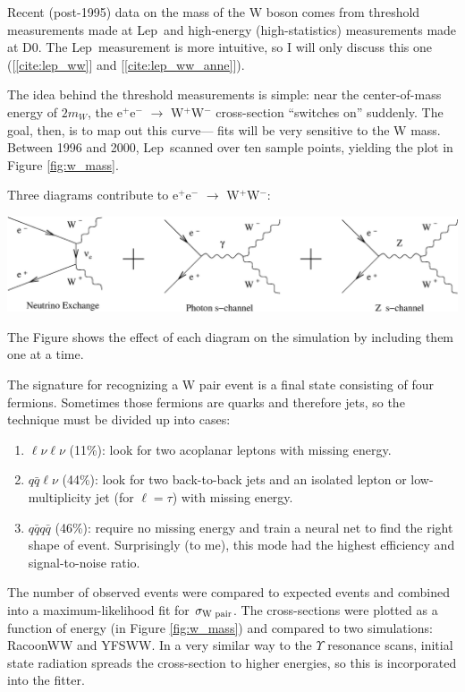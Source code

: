\documentclass[12pt]{article}
\def\lep{{\sc Lep}}
\def\dzero{{\sc D0}}
\begin{document}
Recent (post-1995) data on the mass of the W boson comes from
threshold measurements made at \lep\ and high-energy (high-statistics)
measurements made at \dzero. The \lep\ measurement is more intuitive, so
I will only discuss this one ([\ref{cite:lep_ww}] and
[\ref{cite:lep_ww_anne}]).

The idea behind the threshold measurements is simple: near the
center-of-mass energy of $2m_W$, the e$^+$e$^-$ $\to$ W$^+$W$^-$
cross-section ``switches on'' suddenly. The goal, then, is to map out
this curve--- fits will be very sensitive to the W mass. Between 1996
and 2000, \lep{}anned over ten sample points, yielding the plot in
Figure \ref{fig:w_mass}.

Three diagrams contribute to e$^+$e$^-$ $\to$ W$^+$W$^-$:
\begin{center}
  \includegraphics[width=0.8\linewidth]{w_mass_diagrams.eps}
\end{center}
The Figure shows the effect of each diagram on the simulation by
including them one at a time.

The signature for recognizing a W pair event is a final state
consisting of four fermions. Sometimes those fermions are quarks and
therefore jets, so the technique must be divided up into cases:
\begin{enumerate}

  \item $\ell \nu \ell \nu$ (11\%): look for two acoplanar leptons
  with missing energy.

  \item $q\bar{q} \ell \nu$ (44\%): look for two back-to-back jets and
  an isolated lepton or low-multiplicity jet (for $\ell=\tau$) with
  missing energy.

  \item $q\bar{q} q\bar{q}$ (46\%): require no missing energy and
  train a neural net to find the right shape of event. Surprisingly
  (to me), this mode had the highest efficiency and signal-to-noise
  ratio.

\end{enumerate}

The number of observed events were compared to expected events and
combined into a maximum-likelihood fit for $\sigma_{\mbox{\scriptsize
W pair}}$. The cross-sections were plotted as a function of energy (in
Figure \ref{fig:w_mass}) and compared to two simulations: RacoonWW and
YFSWW. In a very similar way to the $\Upsilon$ resonance scans,
initial state radiation spreads the cross-section to higher energies,
so this is incorporated into the fitter.
\end{document}
